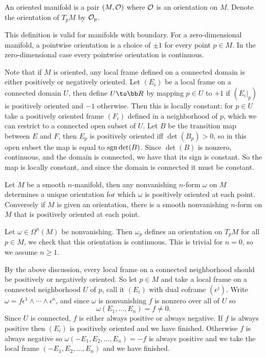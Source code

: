     An {\emphcolor oriented manifold} is a pair $(M,{{\cal O}})$ where ${{\cal O}}$ is an orientation on $M$.
    Denote the orientation of $T_pM$ by ${{\cal O}}_p$.

\edefn

This definition is valid for manifolds with boundary.
For a zero-dimensional manifold, a pointwise orientation is a choice of $\pm1$ for every point $p\in M$.
In the zero-dimensional case every pointwise orientation is continuous.

Note that if $M$ is oriented, any local frame defined on a connected domain is either positively or negatively oriented.
Let $(E_i)$ be a local frame on a connected domain $U$, then define $U\to\bR$ by mapping $p\in U$ to $+1$ if $(E_i|_p)$ is
positively oriented and $-1$ otherwise.
Then this is locally constant: for $p\in U$ take a positively oriented frame $(F_i)$ defined in a neighborhood of $p$,
which we can restrict to a connected open subset of $U$.
Let $B$ be the transition map between $E$ and $F$, then $E_p$ is positively oriented iff $\det(B_p)>0$, so in this open
subset the map is equal to ${\rm sgn}\mathop{\rm det}\nolimits(B)$.
Since $\det(B)$ is nonzero, continuous, and the domain is connected, we have that its sign is constant.
So the map is locally constant, and since the domain is connected it must be constant.

\bprop

    Let $M$ be a smooth $n$-manifold, then any nonvanishing $n$-form $\omega$ on $M$ determines a unique orientation for
    which $\omega$ is positively oriented at each point.
    Conversely if $M$ is given an orientation, there is a smooth nonvanishing $n$-form on $M$ that is positively oriented
    at each point.

\eprop

\bproof

    Let $\omega\in\Omega^n(M)$ be nonvanishing.
    Then $\omega_p$ defines an orientation on $T_pM$ for all $p\in M$, we check that this orientation is continuous.
    This is trivial for $n=0$, so we assume $n\geq1$.

    By the above discussion, every local frame on a connected neighborhood should be positively or negatively oriented.
    So let $p\in M$ and take a local frame on a connected neighborhood $U$ of $p$, call it $(E_i)$ with dual coframe
    $(\epsilon^j)$.
    Write $\omega=f\epsilon^1\wedge\cdots\wedge\epsilon^n$, and since $\omega$ is nonvanishing $f$ is nonzero over all of $U$
    so
    $$ \omega(E_1,\dots,E_n) = f \neq 0 . $$
    Since $U$ is connected, $f$ is either always positive or always negative.
    If $f$ is always positive then $(E_i)$ is positively oriented and we have finished.
    Otherwise $f$ is always negative so $\omega(-E_1,E_2,\dots,E_n)=-f$ is always positive and we take the local frame
    $(-E_1,E_2,\dots,E_n)$ and we have finished.

